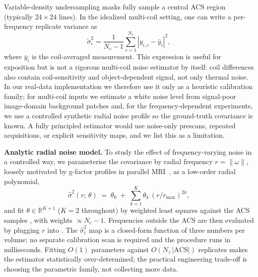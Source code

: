 \documentclass[10pt,twocolumn,letterpaper]{article}
\newcommand{\hatsig}{\hat{\sigma}}
\begin{document}
Variable-density undersampling masks fully sample a central ACS region
(typically $24 \times 24$ lines). In the idealized multi-coil setting, one
can write a per-frequency replicate variance as
\begin{equation}
  \tilde{\sigma}_i^2 = \frac{1}{N_c - 1}
  \sum_{c=1}^{N_c} \left|y_{i,c} - \bar{y}_i\right|^2,
  \label{eq:acs}
\end{equation}
where $\bar{y}_i$ is the coil-averaged measurement. This expression is useful
for exposition but is not a rigorous multi-coil noise estimator by itself:
coil differences also contain coil-sensitivity and object-dependent signal,
not only thermal noise. In our real-data implementation we therefore use it
only as a heuristic calibration family; for multi-coil inputs we estimate a
white noise level from signal-poor image-domain background patches and, for the
frequency-dependent experiments, we use a controlled synthetic radial noise
profile so the ground-truth covariance is known. A fully principled estimator
would use noise-only prescans, repeated acquisitions, or explicit sensitivity
maps, and we list this as a limitation.

\textbf{Analytic radial noise model.} To study the effect of frequency-varying
noise in a controlled way, we parameterise the covariance by radial frequency
$r=\|\omega\|$, loosely motivated by g-factor profiles in parallel
MRI~\cite{uecker2014espirit},
as a low-order radial polynomial,
\begin{equation}
  \hatsig^2(r;\,\theta) \;=\; \theta_0 \;+\; \sum_{k=1}^{K}
  \theta_k\,(r/r_{\max})^{2k},
  \label{eq:radial_model}
\end{equation}
and fit $\theta\!\in\!\mathbb{R}^{K+1}$ ($K{=}2$ throughout) by weighted
least squares against the ACS samples , with weights
$\propto N_c{-}1$. Frequencies outside the ACS are then evaluated by
plugging $r$ into . The $\hat\sigma_i^2$ map
is a closed-form function of three numbers per volume; no separate
calibration scan is required and the procedure runs in milliseconds.
Fitting $O(1)$ parameters against $O(N_z\,|\text{ACS}|)$ replicates makes
the estimator statistically over-determined; the practical engineering
trade-off is choosing the parametric family, not collecting more data.
\end{document}
